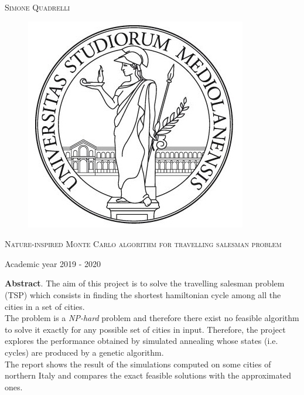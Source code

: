 \documentclass{article}
\begin{document}
\begin{titlepage}
	
	
	\begin{center}
		\vspace{2 cm}
		{\Large \textsc{Simone Quadrelli} }
	\end{center}
	
	
	\begin{figure}[H]
		\vspace{2 cm}
		\centering
		\includegraphics[width=0.30\linewidth]{tesiSCIENZE_TECNOLOGIE.jpg}
		
	\end{figure}
	
	\begin{center}
		\vspace{2 cm}
		{\Large \textsc{Nature-inspired Monte Carlo algorithm for travelling salesman problem} }
	\end{center}

	\par
	\vspace{3 cm}
	
	\begin{center}
		{\large Academic year 2019 - 2020}
	\end{center}
\end{titlepage}

\newpage 
{}
\tableofcontents
\listoftables
\listoffigures
\newpage

\noindent \textbf{Abstract}. The aim of this project is to solve the travelling salesman problem (TSP) which consists in finding the shortest hamiltonian cycle among all the cities in a set of cities.\\
The problem is a \textit{NP-hard} problem and therefore there exist no feasible algorithm to solve it exactly for any possible set of cities in input. Therefore, the project explores the performance obtained by simulated annealing whose states (i.e. cycles) are produced by a genetic algorithm.\\
The report shows the result of the simulations computed on some cities of northern Italy and compares the exact feasible solutions with the approximated ones.
\end{document}
